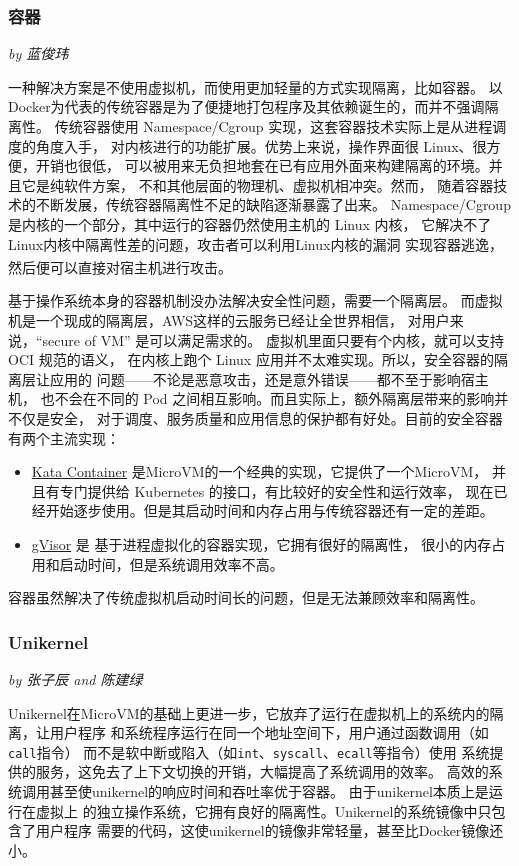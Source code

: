 \documentclass[UTF8,fontset=none,linespread=1.15]{ctexart}
\let\nosupcite\cite
\renewcommand*{\cite}[1]{\textsuperscript{\nosupcite{#1}}}
\newcommand{\sectionauthor}[1]{%
\vspace*{-5ex}
\noindent\textrm{\hfill\textit{by #1}}
\vspace*{2ex}\par}
\begin{document}
\subsubsection{容器}\sectionauthor{蓝俊玮}
一种解决方案是不使用虚拟机，而使用更加轻量的方式实现隔离，比如容器。
以Docker为代表的传统容器是为了便捷地打包程序及其依赖诞生的，而并不强调隔离性。
传统容器使用 Namespace/Cgroup 实现，这套容器技术实际上是从进程调度的角度入手，
对内核进行的功能扩展。优势上来说，操作界面很 Linux、很方便，开销也很低，
可以被用来无负担地套在已有应用外面来构建隔离的环境。并且它是纯软件方案，
不和其他层面的物理机、虚拟机相冲突。然而，
随着容器技术的不断发展，传统容器隔离性不足的缺陷逐渐暴露了出来。
Namespace/Cgroup 是内核的一个部分，其中运行的容器仍然使用主机的 Linux 内核，
它解决不了Linux内核中隔离性差的问题，攻击者可以利用Linux内核的漏洞
实现容器逃逸，然后便可以直接对宿主机进行攻击。\cite{bib:docker-security-selinux}

基于操作系统本身的容器机制没办法解决安全性问题，需要一个隔离层。
而虚拟机是一个现成的隔离层，AWS这样的云服务已经让全世界相信，
对用户来说，“secure of VM” 是可以满足需求的。
虚拟机里面只要有个内核，就可以支持 OCI 规范的语义，
在内核上跑个 Linux 应用并不太难实现。所以，安全容器的隔离层让应用的
问题——不论是恶意攻击，还是意外错误——都不至于影响宿主机，
也不会在不同的 Pod 之间相互影响。而且实际上，额外隔离层带来的影响并不仅是安全，
对于调度、服务质量和应用信息的保护都有好处。目前的安全容器有两个主流实现：
\begin{itemize}
\item \href{https://github.com/kata-containers/kata-containers}{Kata Container} 是MicroVM的一个经典的实现，它提供了一个MicroVM，
并且有专门提供给 Kubernetes 的接口，有比较好的安全性和运行效率，
现在已经开始逐步使用。但是其启动时间和内存占用与传统容器还有一定的差距。
\item  \href{https://github.com/google/gvisor}{gVisor} 是
基于进程虚拟化的容器实现，它拥有很好的隔离性，
很小的内存占用和启动时间，但是系统调用效率不高。
\end{itemize}

容器虽然解决了传统虚拟机启动时间长的问题，但是无法兼顾效率和隔离性。

\subsubsection{Unikernel}\sectionauthor{张子辰 and 陈建绿}
Unikernel在MicroVM的基础上更进一步，它放弃了运行在虚拟机上的系统内的隔离，让用户程序
和系统程序运行在同一个地址空间下，用户通过函数调用（如\texttt{call}指令）
而不是软中断或陷入（如\texttt{int}、\texttt{syscall}、\texttt{ecall}等指令）使用
系统提供的服务，这免去了上下文切换的开销，大幅提高了系统调用的效率。
高效的系统调用甚至使unikernel的响应时间和吞吐率优于容器。
由于unikernel本质上是运行在虚拟上
的独立操作系统，它拥有良好的隔离性。Unikernel的系统镜像中只包含了用户程序
需要的代码，这使unikernel的镜像非常轻量，甚至比Docker镜像还小。
\end{document}
